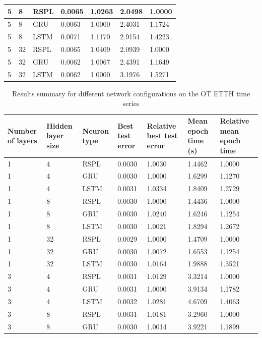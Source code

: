 \documentclass[sn-apa]{sn-jnl}%
\begin{document}
\begin{table}[H]
\begin{tabular}{|p{1.4cm}|p{1.4cm}|p{1.4cm}|p{1.5cm}|p{2.5cm}|p{1.9cm}|p{2cm}|}
\hline
 5 &   8 &   RSPL & 0.0065 & 1.0263 & 2.0498 &  1.0000 \\
\hline
 5 &   8 &   GRU & 0.0063 & 1.0000 & 2.4031 &  1.1724 \\
\hline
 5 &   8 &  LSTM & 0.0071 & 1.1170 & 2.9154 &  1.4223 \\
\hline
 5 &  32 &   RSPL & 0.0065 & 1.0409 & 2.0939 &  1.0000 \\
\hline
 5 &  32 &   GRU & 0.0062 & 1.0067 & 2.4391 &  1.1649 \\
\hline
 5 &  32 &  LSTM & 0.0062 & 1.0000 & 3.1976 &  1.5271 \\
\hline
\end{tabular}
\end{table}

\begin{table}[H]
\caption{Results summary for different network configurations on the OT ETTH time series}
\begin{tabular}{|p{1.4cm}|p{1.4cm}|p{1.4cm}|p{1.5cm}|p{2.5cm}|p{1.9cm}|p{2cm}|}
\hline
Number of layers & Hidden layer size & Neuron type & Best test error & Relative best test error & Mean epoch time (s) & Relative mean epoch time \\
\hline
1 &   4 &   RSPL & 0.0030 & 1.0030 & 1.4462 &  1.0000 \\
\hline
1 &   4 &   GRU & 0.0030 & 1.0000 & 1.6299 &  1.1270 \\
\hline
1 &   4 &  LSTM & 0.0031 & 1.0334 & 1.8409 &  1.2729 \\
\hline
1 &   8 &   RSPL & 0.0030 & 1.0000 & 1.4436 &  1.0000 \\
\hline
1 &   8 &   GRU & 0.0030 & 1.0240 & 1.6246 &  1.1254 \\
\hline
1 &   8 &  LSTM & 0.0030 & 1.0021 & 1.8294 &  1.2672 \\
\hline
1 &  32 &   RSPL & 0.0029 & 1.0000 & 1.4709 &  1.0000 \\
\hline
1 &  32 &   GRU & 0.0030 & 1.0072 & 1.6553 &  1.1254 \\
\hline
1 &  32 &  LSTM & 0.0030 & 1.0164 & 1.9888 &  1.3521 \\
\hline
3 &   4 &   RSPL & 0.0031 & 1.0129 & 3.3214 &  1.0000 \\
\hline
3 &   4 &   GRU & 0.0031 & 1.0000 & 3.9134 &  1.1782 \\
\hline
3 &   4 &  LSTM & 0.0032 & 1.0281 & 4.6709 &  1.4063 \\
\hline
3 &   8 &   RSPL & 0.0031 & 1.0181 & 3.2960 &  1.0000 \\
\hline
3 &   8 &   GRU & 0.0030 & 1.0014 & 3.9221 &  1.1899 \\

\end{tabular}
\end{table}
\end{document}
